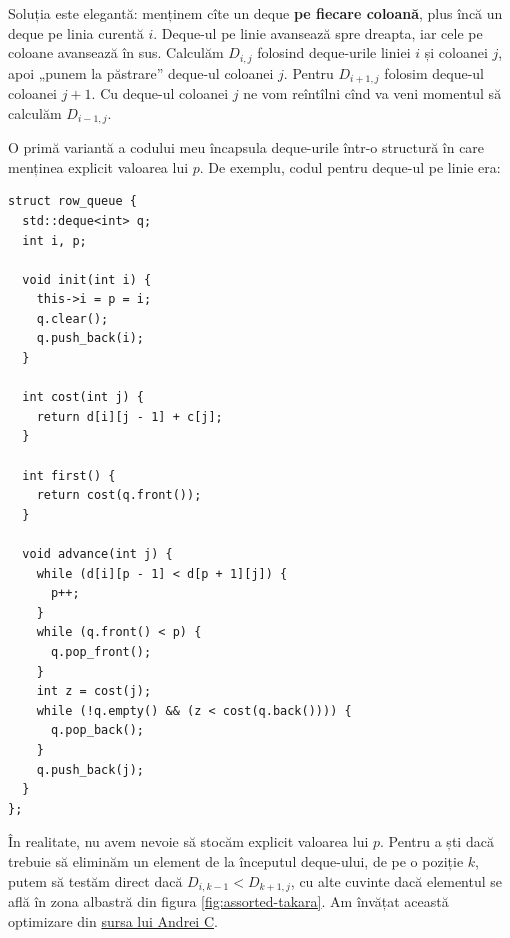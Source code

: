 \documentclass[../main.tex]{subfiles}
\begin{document}
Soluția este elegantă: menținem cîte un deque \textbf{pe fiecare coloană}, plus încă un deque pe linia curentă $i$. Deque-ul pe linie avansează spre dreapta, iar cele pe coloane avansează în sus. Calculăm $D_{i,j}$ folosind deque-urile liniei $i$ și coloanei $j$, apoi „punem la păstrare” deque-ul coloanei $j$. Pentru $D_{i+1,j}$ folosim deque-ul coloanei $j+1$. Cu deque-ul coloanei $j$ ne vom reîntîlni cînd va veni momentul să calculăm $D_{i-1,j}$.

O primă variantă a codului meu încapsula deque-urile într-o structură în care menținea explicit valoarea lui $p$. De exemplu, codul pentru deque-ul pe linie era:

\begin{verbatim}
struct row_queue {
  std::deque<int> q;
  int i, p;

  void init(int i) {
    this->i = p = i;
    q.clear();
    q.push_back(i);
  }

  int cost(int j) {
    return d[i][j - 1] + c[j];
  }

  int first() {
    return cost(q.front());
  }

  void advance(int j) {
    while (d[i][p - 1] < d[p + 1][j]) {
      p++;
    }
    while (q.front() < p) {
      q.pop_front();
    }
    int z = cost(j);
    while (!q.empty() && (z < cost(q.back()))) {
      q.pop_back();
    }
    q.push_back(j);
  }
};
\end{verbatim}

În realitate, nu avem nevoie să stocăm explicit valoarea lui $p$. Pentru a ști dacă trebuie să eliminăm un element de la începutul deque-ului, de pe o poziție $k$, putem să testăm direct dacă $D_{i,k-1} < D_{k+1,j}$, cu alte cuvinte dacă elementul se află în zona albastră din figura \ref{fig:assorted-takara}. Am învățat această optimizare din \href{https://infoarena.ro/job_detail/3198563?action=view-source}{sursa lui Andrei C}.
\end{document}
